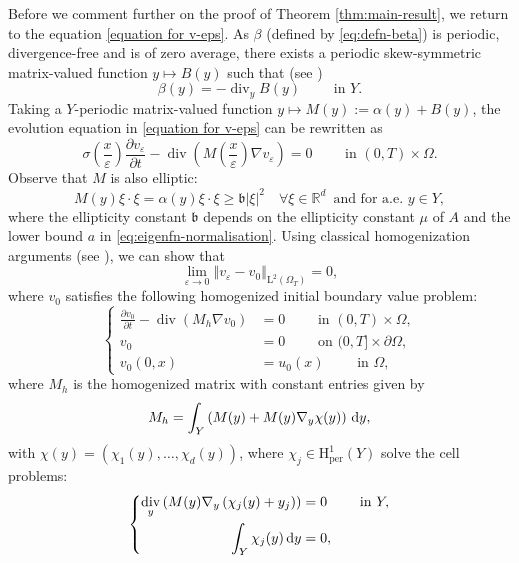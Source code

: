 \documentclass[preprint, 12pt]{amsart}
\numberwithin{equation}{section}
\numberwithin{equation}{section}
\newcommand\RR{\mathbb{R}}
\newcommand{\eps}{\varepsilon}
\DeclareMathOperator{\dv}{div}
\begin{document}
Before we comment further on the proof of Theorem \ref{thm:main-result}, we return to the equation \eqref{equation for v-eps}. As $\beta$ (defined by \eqref{eq:defn-beta}) is periodic, divergence-free and is of zero average, there exists a periodic skew-symmetric matrix-valued function $y\mapsto B(y)$ such that (see \cite[Lemma 1, p. 809]{capdeboscq1998homogenization})
\[
\beta(y) = - \dv_y B(y) \qquad \mbox{ in }Y.
\]
Taking a $Y$-periodic matrix-valued function $y\mapsto M(y) := \alpha(y) + B(y)$, the evolution equation in \eqref{equation for v-eps} can be rewritten as
\begin{equation}\label{equation for v-eps-bis}
\sigma\left(\frac{x}{\varepsilon}\right)\frac{\partial v_\eps}{\partial t} - \dv\left(M\left(\frac{x}{\varepsilon}\right)\nabla v_\eps\right) = 0 \qquad \mbox{ in }(0,T)\times\Omega.
\end{equation}
Observe that $M$ is also elliptic:
\[
M(y)\xi\cdot\xi = \alpha(y)\xi\cdot\xi \ge \mathfrak b \left\vert \xi\right\vert^2 \quad \forall \xi\in\RR^d \, \mbox{ and for a.e. }y\in Y,
\]
where the ellipticity constant $\mathfrak b$ depends on the ellipticity constant $\mu$ of $A$ and the lower bound $a$ in \eqref{eq:eigenfn-normalisation}. Using classical homogenization arguments (see \cite[Theorem 11.4, p. 211]{cioranescu1999introduction}), we can show that 
\begin{equation}\label{eq:veps-to-v0}
\lim_{\eps\to0} \left\Vert v_\eps - v_0 \right\Vert_{\mathrm L^2(\Omega_T)} = 0,
\end{equation}
where $v_0$ satisfies the following homogenized initial boundary value problem:
\begin{equation}\label{eq:homogeneqn-v0}
\left\{
\begin{aligned}
\frac{\partial v_0}{\partial t} - \dv\left(M_h\nabla v_0\right) & =  0 \qquad \mbox{ in }(0,T)\times \Omega,
\\
v_0 & = 0 \qquad \mbox{ on } (0,T]\times \partial \Omega,
\\
v_0(0,x) & = u_0(x) \qquad \mbox{ in } \Omega,
\end{aligned}\right.
\end{equation}
where $M_h$ is the homogenized matrix with constant entries given by
\[
M_h = \int_Y \left( M(y) + M(y) \nabla_y \chi(y) \right)\, {\rm d}y,
\]
with $\chi(y) = \left( \chi_1(y), \dots, \chi_d(y) \right)$, where $\chi_j\in \mathrm H^1_{\text{per}}(Y)$ solve the cell problems:
\begin{equation}\label{eq:cellpb}
\left\{
\begin{aligned}
\dv_y\left(M(y)\nabla_y \left( \chi_j(y) + y_j \right)\right) & = 0 \qquad \mbox{ in }Y,
\\
\int_Y \chi_j(y) \, {\rm d} y & = 0,
\end{aligned}\right.
\end{equation}
\end{document}
